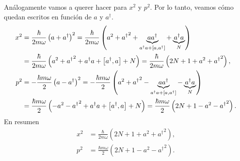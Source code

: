 \documentclass[10pt, a4paper]{article}
\newcommand{\xprefactsq}{\frac{\hbar}{2m\omega}}
\newcommand{\pprefactsq}{\frac{\hbar m \omega}{2}}
\newcommand{\Nexpr}{a^\dagger a}
\newcommand{\N}{N}
\numberwithin{equation}{subsection}
\begin{document}
Análogamente vamos a querer hacer para $x^2$ y $p^2$. Por lo tanto,
veamos cómo quedan escritos en función de $a$ y $a^\dagger$.
\begin{align}
  x^2 &= \xprefactsq\left(a + a^\dagger\right)^2 = \xprefactsq\left(a^2 +
    {a^\dagger}^2 + \underbrace{aa^\dagger}_{a^\dagger a + \comm{a}{a^\dagger}}
    + \underbrace{\Nexpr}_{\N} \right) \nonumber \\
  &= \xprefactsq\left(a^2 + {a^\dagger}^2 +
    \Nexpr + \comm{a^\dagger}{a} + \N\right) = \xprefactsq\left(2\N + 1 + a^2
    + {a^\dagger}^2\right), \\
  p^2 &= -\pprefactsq\left(a - a^\dagger\right)^2 = -\pprefactsq\left(a^2 +
    {a^\dagger}^2 - \underbrace{aa^\dagger}_{a^\dagger a + \comm{a}{a^\dagger}}
    - \underbrace{\Nexpr}_{\N} \right) \nonumber \\
  &= \pprefactsq\left(-a^2 - {a^\dagger}^2 +
    \Nexpr + \comm{a^\dagger}{a} + \N\right) = \pprefactsq\left(2\N + 1 - a^2
    - {a^\dagger}^2\right).
\end{align}
En resumen
\begin{align}
  x^2 &= \xprefactsq\left(2\N + 1 + a^2 + {a^\dagger}^2\right),
    \label{eq:x2_aadagger} \\
  p^2 &= \pprefactsq\left(2\N + 1 - a^2 - {a^\dagger}^2\right).
    \label{eq:p2_aadagger}
\end{align}

\bigbreak
\end{document}
